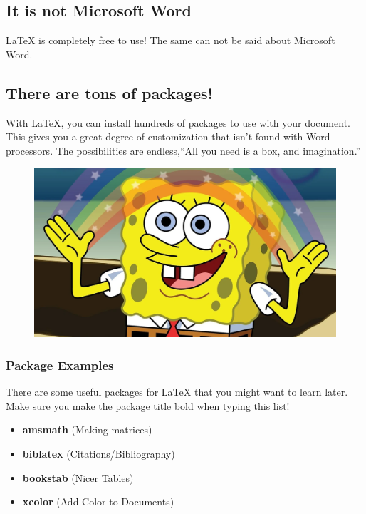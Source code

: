 \subsection{It is not Microsoft Word}
LaTeX is completely free to use! The same can not be said about Microsoft
Word.

\subsection{There are tons of packages!}
With LaTeX, you can install hundreds of packages to use with your document.
This gives you a great degree of customization that isn’t found with Word processors. The possibilities are endless,``All you need is a box, and imagination.''


\begin{figure}[htp]
    \centering
    \includegraphics[scale=0.17]{imagination.png}

\end{figure}

\subsubsection{Package Examples}
There are some useful packages for LaTeX that you might want to learn later.
Make sure you make the package title bold when typing this list!

\begin{itemize}
\item \textbf{amsmath} (Making matrices)
\item \textbf{biblatex} (Citations/Bibliography)
\item \textbf{bookstab} (Nicer Tables)
\item \textbf{xcolor} (Add Color to Documents)
\end{itemize}

